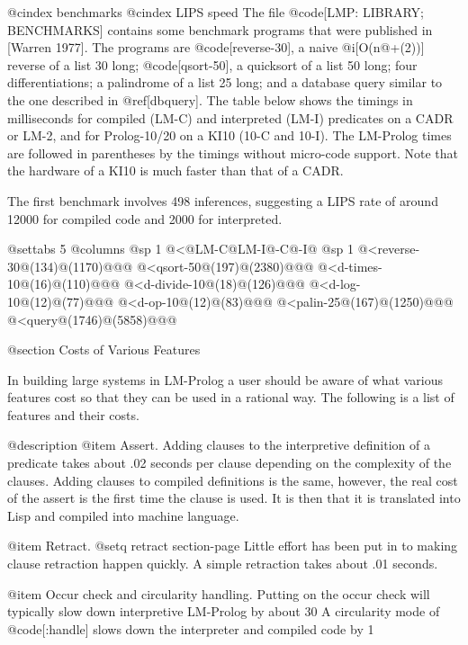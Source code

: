 {@cindex benchmarks
@cindex LIPS speed
The file @code[LMP: LIBRARY; BENCHMARKS] contains some benchmark programs
that were published in [Warren 1977].  The programs are @code[reverse-30], a
naive @i[O(n@+(2))] reverse of a list 30 long; @code[qsort-50], 
a quicksort of a list 50 long; 
four differentiations; a palindrome of a list 25 long;
and a database query similar to the one described in @ref[dbquery].
The table below shows the timings in milliseconds
for compiled (LM-C) and interpreted (LM-I) predicates on a CADR or LM-2,
and for Prolog-10/20 on a KI10 (10-C and 10-I).
The LM-Prolog times are followed in parentheses by the timings without
micro-code support.
Note that the hardware
of a KI10 is much faster than that of a CADR.

The first benchmark involves 498 inferences,
suggesting a LIPS rate of around 12000 for compiled code and
2000 for interpreted. 

@settabs 5 @columns
@sp 1
@<@\@hfill LM-C@\@hfill LM-I@-C@-I@\@cr
@sp 1
@<reverse-30@(134)@(1170)@@@\@cr
@<qsort-50@(197)@(2380)@@@\@cr
@<d-times-10@(16)@(110)@@@\@cr
@<d-divide-10@(18)@(126)@@@\@cr
@<d-log-10@(12)@(77)@@@\@cr
@<d-op-10@(12)@(83)@@@\@cr
@<palin-25@(167)@(1250)@@@\@cr
@<query@(1746)@(5858)@@@\@cr

@section Costs of Various Features

In building large systems in LM-Prolog a user should be aware of what
various features cost so that they can be used in a rational way.
The following is a list of features and their costs.

@description
@item Assert.
Adding clauses to the interpretive definition of a predicate
takes about .02 seconds per clause depending on the complexity of the clauses.
Adding clauses to compiled definitions is the same, however, the real
cost of the assert is the first time the clause is used.
It is then that it is translated into Lisp and compiled into machine language.

@item Retract.
@setq retract section-page
Little effort has been put in to making clause retraction happen quickly.
A simple retraction takes about .01 seconds.

@item Occur check and circularity handling.
Putting on the occur check will typically slow down
interpretive LM-Prolog by about 30%
A circularity mode of @code[:handle] slows down the interpreter and compiled
code by 1%

}

